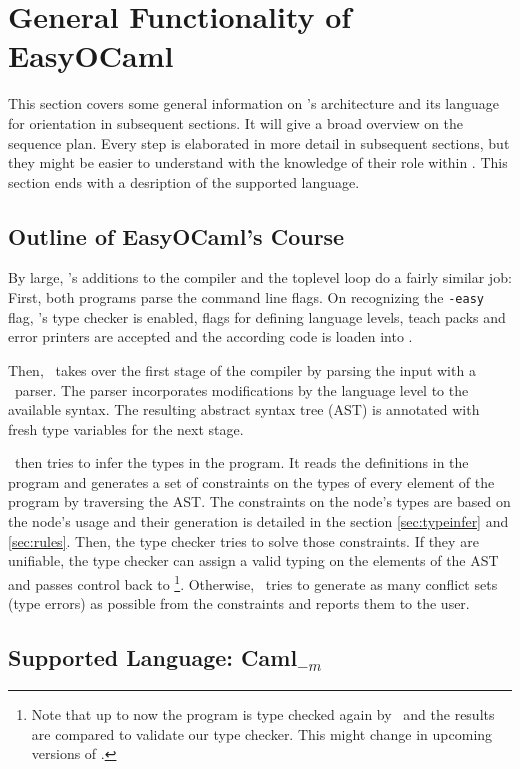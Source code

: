 
\section{General Functionality of EasyOCaml}
\label{sec:general}

This section covers some general information on \easyocaml's architecture and
its language for orientation in subsequent sections.
It will give a broad overview on the sequence plan.
Every step is elaborated in more detail in subsequent sections, but they might
be easier to understand with the knowledge of their role within \easyocaml.
This section ends with a desription of the supported language.

\subsection{Outline of EasyOCaml's Course}

By large, \easyocaml's additions to the compiler and the toplevel loop do a
fairly similar job: First, both programs parse the command line flags.
On recognizing the \texttt{-easy} flag, \easyocaml's type checker is enabled,
flags for defining language levels, teach packs and error printers are accepted
and the according code is loaden into \easyocaml.

Then, \easyocaml\ takes over the first stage of the compiler by parsing the
input with a \camlpf\ parser. The parser incorporates modifications by the
language level to the available syntax. The resulting abstract syntax tree (AST)
is annotated with fresh type variables for the next stage.

\easyocaml\ then tries to infer the types in the program. It reads the definitions in
the program and generates a set of constraints on the types of every element of
the program by traversing the AST. The constraints on the node's types are based
on the node's usage and their generation is detailed in the section
\ref{sec:typeinfer} and \ref{sec:rules}.
Then, the type checker tries to solve those constraints. If they are unifiable,
the type checker can assign a valid typing on the elements of the AST and passes
control back to \ocaml\footnote{Note that up to now the program is type checked
again by \ocaml\ and the results are compared to validate our type checker. This
might change in upcoming versions of \easyocaml.}.
Otherwise, \easyocaml\ tries to generate as many conflict sets (type errors) as
possible from the constraints and reports them to the user.

\subsection{Supported Language: Caml$_{-m}$}
\label{sec:language}

